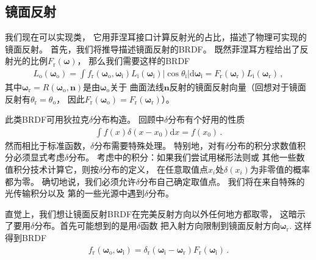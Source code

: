 \subsection{镜面反射}\label{sub:镜面反射}
我们现在可以实现类，
它用菲涅耳接口计算反射光的占比，描述了物理可实现的镜面反射。
首先，我们将推导描述镜面反射的BRDF。
既然菲涅耳方程给出了反射光的比例$F_{\mathrm{r}}({\bm\omega})$，
那么我们需要这样的BRDF
\begin{align*}
    L_{\mathrm{o}}({\bm\omega}_{\mathrm{o}})=\int{f_{\mathrm{r}}({\bm\omega}_{\mathrm{o}},{\bm\omega}_{\mathrm{i}})L_{\mathrm{i}}({\bm\omega}_{\mathrm{i}})|\cos\theta_{\mathrm{i}}|\mathrm{d}{\bm\omega}_{\mathrm{i}}}=F_{\mathrm{r}}({\bm\omega}_{\mathrm{r}})L_{\mathrm{i}}({\bm\omega}_{\mathrm{r}})\, ,
\end{align*}
其中${\bm\omega}_{\mathrm{r}}=R({\bm\omega}_{\mathrm{o}},{\bm n})$是由${\bm\omega}_{\mathrm{o}}$关于
曲面法线$\bm n$反射的镜面反射向量（回想对于镜面反射有$\theta_{\mathrm{r}}=\theta_{\mathrm{o}}$，
因此$F_{\mathrm{r}}({\bm\omega}_{\mathrm{o}})=F_{\mathrm{r}}({\bm\omega}_{\mathrm{r}})$）。

此类BRDF可用狄拉克$\delta$分布构造。
回顾中$\delta$分布有个好用的性质
\begin{align}\label{eq:8.4}
    \int{f(x)\delta(x-x_0)\mathrm{d}x}=f(x_0)\, .
\end{align}
然而相比于标准函数，$\delta$分布需要特殊处理。
特别地，对有$\delta$分布的积分求数值积分必须显式考虑$\delta$分布。
考虑中的积分：如果我们尝试用梯形法则或
其他一些数值积分技术计算它，则按$\delta$分布的定义，
在任意取值点$x_i$处$\delta(x_i)$为非零值的概率都为零。
确切地说，我们必须允许$\delta$分布自己确定取值点。
我们将在来自特殊的光传输积分以及
第的一些光源中遇到$\delta$分布。

直觉上，我们想让镜面反射BRDF在完美反射方向以外任何地方都取零，
这暗示了要用$\delta$分布。首先可能想到的是用$\delta$函数
把入射方向限制到镜面反射方向${\bm\omega}_{\mathrm{r}}$.
这样得到BRDF
\begin{align*}
    f_{\mathrm{r}}({\bm\omega}_{\mathrm{o}},{\bm\omega}_{\mathrm{i}})=\delta_{\mathrm{r}}({\bm\omega}_{\mathrm{i}}-{\bm\omega}_{\mathrm{r}})F_{\mathrm{r}}({\bm\omega}_{\mathrm{i}})\, .
\end{align*}

